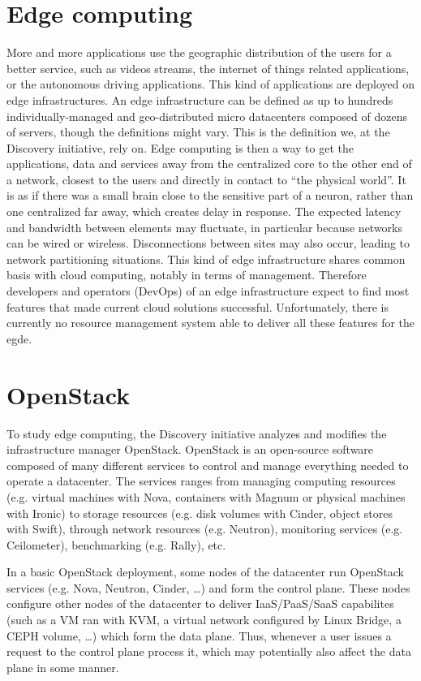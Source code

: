 \section{Edge computing}

More and more applications use the geographic distribution of the users for a better service, such as videos streams, the internet of things related applications, or the autonomous driving applications. This kind of applications are deployed on edge infrastructures. An edge infrastructure can be defined as up to hundreds individually-managed and geo-distributed micro datacenters composed of dozens of servers, though the definitions might vary. This is the definition we, at the Discovery initiative, rely on. Edge computing is then a way to get the applications, data and services away from the centralized core to the other end of a network, closest to the users and directly in contact to ``the physical world''. It is as if there was a small brain close to the sensitive part of a neuron, rather than one centralized far away, which creates delay in response. The expected latency and bandwidth between elements may fluctuate, in particular because networks can be wired or wireless. Disconnections between sites may also occur, leading to network partitioning situations. This kind of edge infrastructure shares common basis with cloud computing, notably in terms of management. Therefore developers and operators (DevOps) of an edge infrastructure expect to find most features that made current cloud solutions successful. Unfortunately, there is currently no resource management system able to deliver all these features for the egde\cite{cherrueau:hal-01812747}.

\section{OpenStack}

To study edge computing, the Discovery initiative analyzes and modifies the infrastructure manager OpenStack. OpenStack is an open-source software composed of many different services to control and manage everything needed to operate a datacenter. The services ranges from managing computing resources (e.g. virtual machines with Nova, containers with Magnum or physical machines with Ironic) to storage resources (e.g. disk volumes with Cinder, object stores with Swift), through network resources (e.g. Neutron), monitoring services (e.g. Ceilometer), benchmarking (e.g. Rally), etc.


In a basic OpenStack deployment, some nodes of the datacenter run OpenStack services (e.g. Nova, Neutron, Cinder, \dots) and form the control plane. These nodes configure other nodes of the datacenter to deliver IaaS/PaaS/SaaS capabilites (such as a VM ran with KVM, a virtual network configured by Linux Bridge, a CEPH volume, \dots) which form the data plane. Thus, whenever a user issues a request to the control plane process it, which  may potentially also affect the data plane in some manner.


